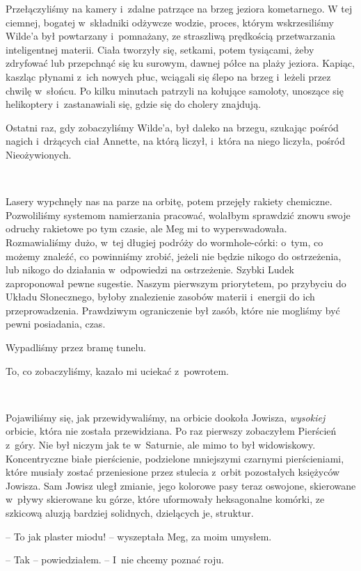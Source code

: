 \documentclass[oneside,polish,11pt,sfheadings]{mwbk}
\begin{document}
Przełączyliśmy na kamery i~zdalne patrzące na brzeg jeziora kometarnego.
W tej ciemnej, bogatej w~składniki odżywcze wodzie, proces, którym
wskrzesiliśmy Wilde'a był powtarzany i~pomnażany, ze straszliwą
prędkością przetwarzania inteligentnej materii. Ciała tworzyły się,
setkami, potem tysiącami, żeby zdryfować lub przepchnąć się ku surowym,
dawnej półce na plaży jeziora. Kapiąc, kaszląc płynami z~ich nowych
płuc, wciągali się ślepo na brzeg i~leżeli przez chwilę w~słońcu. Po
kilku minutach patrzyli na kołujące samoloty, unoszące się helikoptery i~zastanawiali się, gdzie się do cholery znajdują.

Ostatni raz, gdy zobaczyliśmy Wilde'a, był daleko na brzegu, szukając
pośród nagich i~drżących ciał Annette, na którą liczył, i~która na niego
liczyła, pośród Nieożywionych.

~

Lasery wypchnęły nas na parze na orbitę, potem przejęły rakiety
chemiczne. Pozwoliliśmy systemom namierzania pracować, wolałbym
sprawdzić znowu swoje odruchy rakietowe po tym czasie, ale Meg mi to
wyperswadowała. Rozmawialiśmy dużo, w~tej długiej podróży do
wormhole-córki: o~tym, co możemy znaleźć, co powinniśmy zrobić, jeżeli
nie będzie nikogo do ostrzeżenia, lub nikogo do działania w~odpowiedzi
na ostrzeżenie. Szybki Ludek zaproponował pewne sugestie. Naszym
pierwszym priorytetem, po przybyciu do Układu Słonecznego, byłoby
znalezienie zasobów materii i~energii do ich przeprowadzenia. Prawdziwym
ograniczenie był zasób, które nie mogliśmy być pewni posiadania, czas.

Wypadliśmy przez bramę tunelu.

To, co zobaczyliśmy, kazało mi uciekać z~powrotem.

~

Pojawiliśmy się, jak przewidywaliśmy, na orbicie dookoła Jowisza,
\emph{wysokiej} orbicie, która nie została przewidziana. Po raz pierwszy
zobaczyłem Pierścień z~góry. Nie był niczym jak te w~Saturnie, ale mimo
to był widowiskowy. Koncentryczne białe pierścienie, podzielone
mniejszymi czarnymi pierścieniami, które musiały zostać przeniesione
przez stulecia z~orbit pozostałych księżyców Jowisza. Sam Jowisz uległ
zmianie, jego kolorowe pasy teraz oswojone, skierowane w~pływy
skierowane ku górze, które uformowały heksagonalne komórki, ze szkicową
aluzją bardziej solidnych, dzielących je, struktur.

-- To jak plaster miodu! -- wyszeptała Meg, za moim umysłem.

-- Tak -- powiedziałem. -- I~nie chcemy poznać roju.
\end{document}
